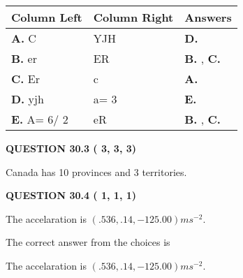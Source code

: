 \documentclass[12pt]{article}
\begin{document}
  
\begin{tabular}{|l|l|l|}
 \hline
 Column Left & Column Right  & Answers       \\ 
 \hline
{\textbf{\large{
A.}}}
C
  & 
YJH
 & 
{\textbf{\large{
D.}}}
 \\ 
 \hline
{\textbf{\large{
B.}}}
er
  & 
ER
 & 
{\textbf{\large{
B.}}}
, 
{\textbf{\large{
C.}}}
 \\ 
 \hline
{\textbf{\large{
C.}}}
Er
  & 
c
 & 
{\textbf{\large{
A.}}}
 \\ 
 \hline
{\textbf{\large{
D.}}}
yjh
  & 
 a= %
3
 & 
{\textbf{\large{
E.}}}
 \\ 
 \hline
{\textbf{\large{
E.}}}
 A= %
6/ %
2

  & 
eR
 & 
{\textbf{\large{
B.}}}
, 
{\textbf{\large{
C.}}}
 \\ 
 \hline
 \end{tabular}
  
  
 
 
 
 
  
\vspace{0.2in}
  
{\textbf{\Large{QUESTION
30.3 
 (          3,          3,          3)
}}}
  
  
 
 
\noindent{}
 
 
Canada has  %
10 provinces and  %
3 territories.
 
 
 
 
  
\vspace{0.2in}
  
{\textbf{\Large{QUESTION
30.4 
 (          1,          1,          1)
}}}
  
  


 
 
\noindent{}
 
 
The accelaration is $  %
(
.536,
.14,
-125.00)
ms^{-2} $.
 
 
 
 
 
 
\noindent{}

The correct answer from the choices is


The accelaration is $  %
(
.536,
.14,
-125.00)
ms^{-2} $.
 
\end{document}
